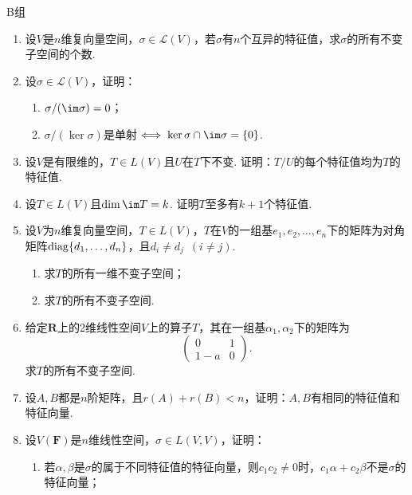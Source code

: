 \centerline{\heiti B组}
\begin{enumerate}
    \item 设$V$是$n$维复向量空间，$\sigma\in \mathcal{L}(V)$，若$\sigma$有$n$个互异的特征值，求$\sigma$的所有不变子空间的个数.

    \item 设$\sigma\in \mathcal{L}(V)$，证明：
          \begin{enumerate}
              \item $\sigma/(\im \sigma)=0$；

              \item $\sigma/(\ker \sigma)$是单射$\iff \ker \sigma\cap\im \sigma=\{0\}$.
          \end{enumerate}

    \item 设$V$是有限维的，$T\in L(V)$且$U$在$T$下不变. 证明：$T/U$的每个特征值均为$T$的特征值.

    \item 设$T\in L(V)$且$\dim\im T=k$. 证明$T$至多有$k+1$个特征值.

    \item 设$V$为$n$维复向量空间，$T\in L(V)$，$T$在$V$的一组基$e_1,e_2,\ldots,e_n$下的矩阵为对角矩阵$\operatorname{diag}\{d_1,\ldots,d_n\}$，且$d_i\neq d_j\enspace(i\neq j)$.
          \begin{enumerate}
              \item 求$T$的所有一维不变子空间；

              \item 求$T$的所有不变子空间.
          \end{enumerate}

    \item 给定$\mathbf{R}$上的2维线性空间$V$上的算子$T$，其在一组基$\alpha_1,\alpha_2$下的矩阵为
          \[\begin{pmatrix}
                  0 & 1 \\ 1-a & 0
              \end{pmatrix}.\]
          求$T$的所有不变子空间.

    \item 设$A,B$都是$n$阶矩阵，且$r(A)+r(B)<n$，证明：$A,B$有相同的特征值和特征向量.

    \item 设$V(\mathbf{F})$是$n$维线性空间，$\sigma\in L(V,V)$，证明：
          \begin{enumerate}
              \item 若$\alpha,\beta$是$\sigma$的属于不同特征值的特征向量，则$c_1c_2\neq 0$时，$c_1\alpha+c_2\beta$不是$\sigma$的特征向量；


\end{enumerate}
\end{enumerate}
